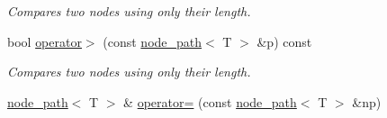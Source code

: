 \begin{DoxyCompactItemize}
\begin{DoxyCompactList}\small\item\em Compares two nodes using only their length. \end{DoxyCompactList}\item 
\hypertarget{classlgraph_1_1utils_1_1node__path_a50387915894923c9e999c157da6e4812}{bool \hyperlink{classlgraph_1_1utils_1_1node__path_a50387915894923c9e999c157da6e4812}{operator$>$} (const \hyperlink{classlgraph_1_1utils_1_1node__path}{node\-\_\-path}$<$ T $>$ \&p) const }\label{classlgraph_1_1utils_1_1node__path_a50387915894923c9e999c157da6e4812}

\begin{DoxyCompactList}\small\item\em Compares two nodes using only their length. \end{DoxyCompactList}\item 
\hypertarget{classlgraph_1_1utils_1_1node__path_a394176d986b6f7c3f3f51978dde52172}{\hyperlink{classlgraph_1_1utils_1_1node__path}{node\-\_\-path}$<$ T $>$ \& \hyperlink{classlgraph_1_1utils_1_1node__path_a394176d986b6f7c3f3f51978dde52172}{operator=} (const \hyperlink{classlgraph_1_1utils_1_1node__path}{node\-\_\-path}$<$ T $>$ \&np)}\label{classlgraph_1_1utils_1_1node__path_a394176d986b6f7c3f3f51978dde52172}


\end{DoxyCompactItemize}
